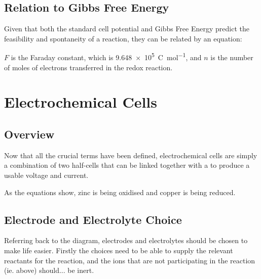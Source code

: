 

		\subsection{Relation to Gibbs Free Energy}

			Given that both the standard cell potential and Gibbs Free Energy predict the feasibility and spontaneity of a reaction, they can
			be related by an equation:



			$F$ is the Faraday constant, which is \SI{9.648e5}{\coulomb\per\mole}, and $n$ is the number of moles of electrons transferred in the
			redox reaction.






	\pagebreak
	\section{Electrochemical Cells}

		\subsection{Overview}

			Now that all the crucial terms have been defined, electrochemical cells are simply a combination of two half-cells that can be
			linked together with a  to produce a usable voltage and current.


			As the equations show, zinc is being oxidised and copper is being reduced.



		\subsection{Electrode and Electrolyte Choice}

			Referring back to the diagram, electrodes and electrolytes should be chosen to make life easier. Firstly the choices need to be
			able to supply the relevant reactants for the reaction, and the ions that are not participating in the reaction (ie.  above)
			should... be inert.


